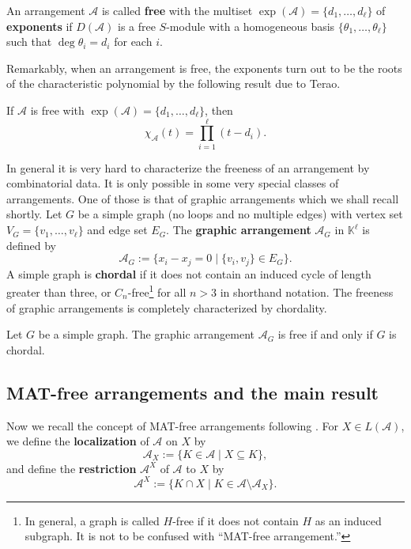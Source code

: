 \documentclass[ALCO, Unicode,published]{cedram}
\newcommand{\A}{\mathcal{A}}
\begin{document}
\begin{definition}
\label{def:free-arr}
An arrangement $ \mathcal{A} $ is called \textbf{free} with the multiset $ \exp(\mathcal{A}) = \{d_{1}, \dots, d_{\ell}\} $ of \textbf{exponents} if $D(\A)$ is a free $S$-module with a homogeneous basis $ \{\theta_{1}, \dots, \theta_{\ell}\}$ such that $ \deg \theta_{i} = d_{i} $ for each $ i $.  
\end{definition}
Remarkably, when an arrangement is free, the exponents turn out to be the roots of the characteristic polynomial by the following result due to Terao. 
\begin{theorem}\label{thm:Factorization}
If $\A$ is free with $\exp(\A) =\{d_{1}, \dots, d_{\ell}\} $, then 
$$\chi_\A(t)= \prod_{i=1}^\ell (t-d_i).$$
\end{theorem}

In general it is very hard to characterize the freeness of an arrangement by combinatorial data. 
It is only possible in some very special classes of arrangements. 
One of those is that of graphic arrangements which we shall recall shortly. 
Let $G$ be a simple graph (\ie  no loops and no multiple edges) with vertex set $V_G = \{v_{1}, \dots, v_{\ell}\}$ and edge set $E_G$.
The  \textbf{graphic arrangement} $\A_G$ in $\mathbb{K}^\ell$ is defined by
$$\A_G:= \{x_i - x_j=0 \mid \{v_i,v_j\} \in E_G \}.$$
A simple graph is  \textbf{chordal} if it does not  contain an induced cycle of length greater than three, or $C_{n}$-free\footnote{In general, a graph is called $H$-free if it does not contain $H$ as an induced subgraph. It is not to be confused with ``MAT-free arrangement.''} for all $n >3$ in shorthand notation.
The freeness of graphic arrangements is completely characterized by chordality.
\begin{theorem}
\label{thm:free-chordal}
Let $G$ be a simple graph. 
The graphic arrangement $\A_G$ is free if and only if $G$ is chordal.
\end{theorem}

\subsection{MAT-free arrangements and the main result}
\label{subsec:MATfree-arr}
 
Now we recall the concept of MAT-free arrangements following \cite{CM20}.
For $X \in L(\A)$, we define the \textbf{localization} of $\A$ on $X$  by 
$${\A}_X := \{ K \in {\A} \mid X \subseteq K\},$$
and define the \textbf{restriction} ${\A}^{X}$ of ${\A}$ to $X$ by 
$${\A}^{X}:= \{ K \cap X \mid K \in{\A }\setminus {\A}_X\}.$$
\end{document}
